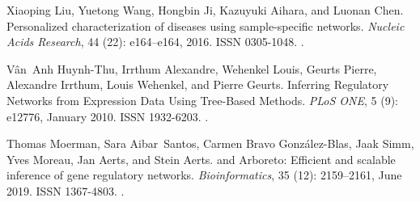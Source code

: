 \documentclass[10pt, a4paper]{article}
\begin{document}
\begin{thebibliography}{59}
	Xiaoping Liu, Yuetong Wang, Hongbin Ji, Kazuyuki Aihara, and Luonan Chen.
	\newblock Personalized characterization of diseases using sample-specific
	networks.
	\newblock \emph{Nucleic Acids Research}, 44 (22): e164--e164,
	2016.
	\newblock ISSN 0305-1048.
	\newblock {}.
	
	V{\^a}n~Anh {Huynh-Thu}, Irrthum Alexandre, Wehenkel Louis, Geurts Pierre,
	Alexandre Irrthum, Louis Wehenkel, and Pierre Geurts.
	\newblock Inferring {{Regulatory Networks}} from {{Expression Data Using
			Tree}}-{{Based Methods}}.
	\newblock \emph{PLoS ONE}, 5 (9): e12776, January 2010.
	\newblock ISSN 1932-6203.
	\newblock {}.
	
	Thomas Moerman, Sara Aibar~Santos, Carmen {Bravo Gonz{\'a}lez-Blas}, Jaak Simm,
	Yves Moreau, Jan Aerts, and Stein Aerts.
	 and {{Arboreto}}: Efficient and scalable inference of
	gene regulatory networks.
	\newblock \emph{Bioinformatics}, 35 (12): 2159--2161, June
	2019.
	\newblock ISSN 1367-4803.
	\newblock {}.
	

\end{thebibliography}
\end{document}
